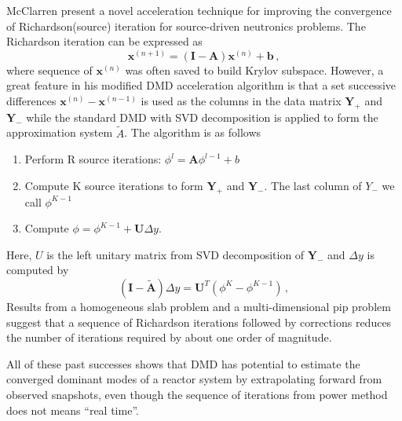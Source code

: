 McClarren present a novel acceleration technique for improving the convergence of Richardson(source) iteration for source-driven neutronics problems.\cite{mcclarren_acceleration_2018}
The Richardson iteration can be expressed as 
\begin{equation}
 \mathbf{x}^{(n+1)} = (\mathbf{I}-\mathbf{A})\mathbf{x}^{(n)} + \mathbf{b} \, ,
 \label{eq:richardson}
\end{equation}
where sequence of $\mathbf{x}^{(n)}$ was often saved to build Krylov subspace. 
However, a great feature in his modified DMD acceleration algorithm is that a set successive differences $\mathbf{x}^{(n)}-\mathbf{x}^{(n-1)}$ is used as the columns in the data matrix $\mathbf{Y}_+$ and $\mathbf{Y}_-$ while the standard DMD with SVD decomposition is applied to form the approximation system $\tilde{A}$.
The algorithm is as follows
\begin{enumerate}
 \item Perform R source iterations: $\phi^{l} = \mathbf{A} \phi^{l-1} +b$
 \item Compute K source iterations to form $\mathbf{Y}_+$ and $\mathbf{Y}_-$. The last column of $Y_-$ we call $\phi^{K-1}$ 
 \item Compute $\phi = \phi^{K-1} + \mathbf{U} \Delta y$.
\end{enumerate} 
Here, $U$ is the left unitary matrix from SVD decomposition of $\mathbf{Y}_-$ and $\Delta y$ is computed by 
\begin{equation}
 (\mathbf{I} - \mathbf{\tilde{A}}) \Delta y = \mathbf{U}^T(\phi^{K} - \phi^{K-1})\, ,
 \label{eq:McClarren}
\end{equation}
Results from a homogeneous slab problem and a multi-dimensional pip problem suggest that a sequence of Richardson iterations followed by corrections reduces the number of iterations required by about one order of magnitude.

All of these past successes shows that DMD has potential to estimate the converged dominant modes of a reactor system by extrapolating forward from observed snapshots, even though the sequence of iterations from power method does not means ``real time''.
